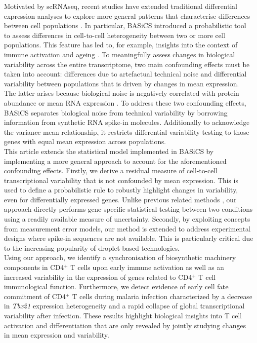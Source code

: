 Motivated by scRNAseq, recent studies have extended traditional differential expression analyses to explore more general patterns that characterise differences between cell populations \citep[e.g.~][]{Korthauer2016}. In particular, BASiCS \citep{Vallejos2015,Vallejos2016a} introduced a probabilistic tool to assess differences in cell-to-cell heterogeneity between two or more cell populations. This feature has led to, for example, insights into the context of immune activation and ageing \citep{Martinez-jimenez2017}. To meaningfully assess changes in biological variability across the entire transcriptome, two main confounding effects must be taken into account: differences due to artefactual technical noise and differential variability between populations that is driven by changes in mean expression. The latter arises because biological noise is negatively correlated with protein abundance \citep{Bar-Even2006, Newman2006, Taniguchi2011} or mean RNA expression \citep{Brennecke2013, Antolovic2017}. To address these two confounding effects, BASiCS separates biological noise from technical variability  by borrowing information from synthetic RNA spike-in molecules. Additionally to acknowledge the variance-mean relationship, it restricts differential variability testing to those genes with equal mean expression across populations. \\

This article extends the statistical model implemented in BASiCS by implementing a more general approach to account for the aforementioned confounding effects. Firstly, we derive a residual measure of cell-to-cell transcriptional variability that is not confounded by mean expression. This is used to define a probabilistic rule to robustly highlight changes in variability, even for differentially expressed genes. Unlike previous related methods \citep[e.g.~][]{Kolodziejczyk2015cell}, our approach directly performs gene-specific statistical testing between two conditions using a readily available measure of uncertainty. Secondly, by exploiting concepts from measurement error models, our method is extended to address experimental designs where spike-in sequences are not available. This is particularly critical due to the increasing popularity of droplet-based technologies. \\

Using our approach, we identify a synchronisation of  biosynthetic machinery components in CD4$^+$ T cells upon early immune activation as well as an increased variability in the expression of genes related to CD4$^+$ T cell immunological function.
Furthermore, we detect evidence of early cell fate commitment of CD4$^+$ T cells during malaria infection characterized by a decrease in \textit{Tbx21} expression heterogeneity and a rapid collapse of global transcriptional variability after infection. These results highlight biological insights into T cell activation and differentiation that are only revealed by jointly studying changes in mean expression and variability.
